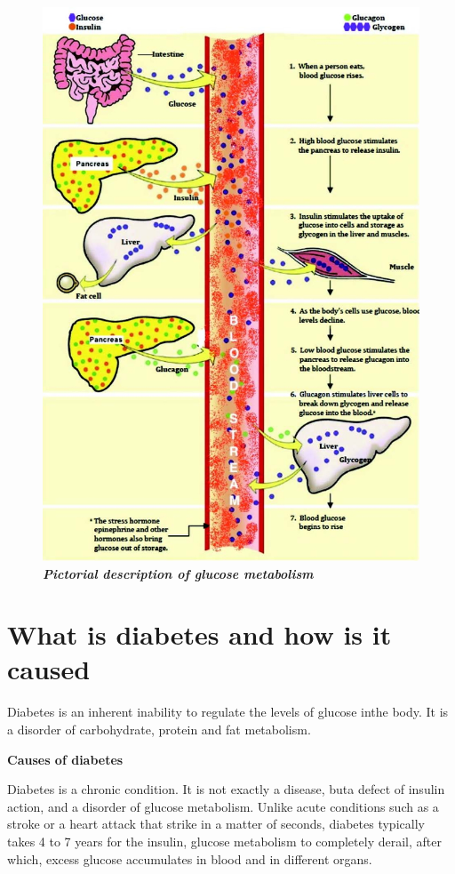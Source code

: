 \begin{figure}[h]
\centering
\includegraphics[scale=2.5]{images/018.jpg}\\
\textbf{\textit{Pictorial description of glucose metabolism}}
\end{figure}


\chapter{What is diabetes and how is it caused}\label{chap3}

Diabetes is an inherent inability to regulate the levels of glucose in\break the body. It is a disorder of carbohydrate, protein and fat metabolism.

\noindent
\textbf{Causes of diabetes}

Diabetes is a chronic condition. It is not exactly a disease, but\break a defect of insulin action, and a disorder of glucose metabolism. Unlike acute conditions such as a stroke or a heart attack that strike in a matter of seconds, diabetes typically takes 4 to 7 years for the insulin, glucose metabolism to completely derail, after which, excess glucose accumulates in blood and in different organs.

